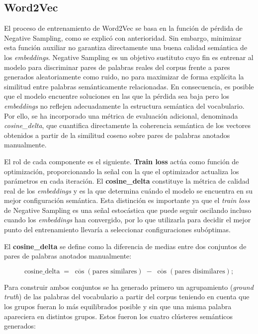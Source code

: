 \subsection{Word2Vec}

El proceso de entrenamiento de Word2Vec se basa en la función de pérdida de Negative Sampling, como se explicó con anterioridad. Sin embargo, minimizar esta función auxiliar no garantiza directamente una buena calidad semántica de los \textit{embeddings}. Negative Sampling es un objetivo sustituto cuyo fin es entrenar al modelo para discriminar pares de palabras reales del corpus frente a pares generados aleatoriamente como ruido, no para maximizar de forma explícita la similitud entre palabras semánticamente relacionadas. En consecuencia, es posible que el modelo encuentre soluciones en las que la pérdida sea baja pero los \textit{embeddings} no reflejen adecuadamente la estructura semántica del vocabulario. Por ello, se ha incorporado una métrica de evaluación adicional, denominada \textit{cosine\_delta}, que cuantifica directamente la coherencia semántica de los vectores obtenidos a partir de la similitud coseno sobre pares de palabras anotados manualmente.

El rol de cada componente es el siguiente. \textbf{Train loss} actúa como función de optimización, proporcionando la señal con la que el optimizador actualiza los parámetros en cada iteración. El \textbf{cosine\_delta} constituye la métrica de calidad real de los \textit{embeddings} y es la que determina cuándo el modelo se encuentra en su mejor configuración semántica. Esta distinción es importante ya que el \textit{train loss} de Negative Sampling es una señal estocástica que puede seguir oscilando incluso cuando los \textit{embeddings} han convergido, por lo que utilizarla para decidir el mejor punto del entrenamiento llevaría a seleccionar configuraciones subóptimas.

El \textbf{cosine\_delta} se define como la diferencia de medias entre dos conjuntos de pares de palabras anotados manualmente:

\begin{equation*}
  \text{cosine\_delta} \;=\; \overline{\cos}(\text{pares similares}) \;-\; \overline{\cos}(\text{pares disimilares});
\end{equation*}

Para construir ambos conjuntos se ha generado primero un agrupamiento (\textit{ground truth}) de las palabras del vocabulario a partir del corpus teniendo en cuenta que los grupos fueran lo más equilibrados posible y sin que una misma palabra apareciera en distintos grupos. Estos fueron los cuatro clústeres semánticos generados:

